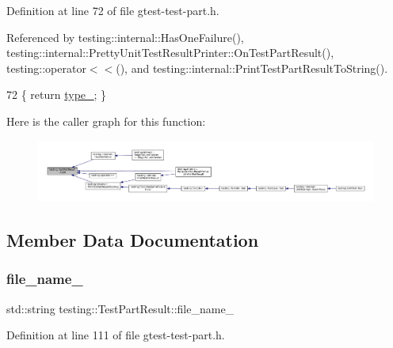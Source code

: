 Definition at line 72 of file gtest-\/test-\/part.\+h.



Referenced by testing\+::internal\+::\+Has\+One\+Failure(), testing\+::internal\+::\+Pretty\+Unit\+Test\+Result\+Printer\+::\+On\+Test\+Part\+Result(), testing\+::operator$<$$<$(), and testing\+::internal\+::\+Print\+Test\+Part\+Result\+To\+String().


\begin{DoxyCode}
72 \{ \textcolor{keywordflow}{return} \hyperlink{classtesting_1_1TestPartResult_a4ee7ac490fe4f10e222fa08c3fa25437}{type\_}; \}
\end{DoxyCode}
Here is the caller graph for this function\+:
\nopagebreak
\begin{figure}[H]
\begin{center}
\leavevmode
\includegraphics[width=350pt]{classtesting_1_1TestPartResult_aab92b225e8a472e78bd3889ca6df0d2a_icgraph}
\end{center}
\end{figure}


\subsection{Member Data Documentation}
\mbox{\label{classtesting_1_1TestPartResult_abf5ab5fc171dc6248579a44353385df6}} 
\subsubsection{\texorpdfstring{file\+\_\+name\+\_\+}{file\_name\_}}
{\footnotesize\ttfamily std\+::string testing\+::\+Test\+Part\+Result\+::file\+\_\+name\+\_\+\hspace{0.3cm}{\ttfamily [private]}}



Definition at line 111 of file gtest-\/test-\/part.\+h.

\mbox{\label{classtesting_1_1TestPartResult_a7a988009362bcdc28d3b801fc6059b5e}} 
